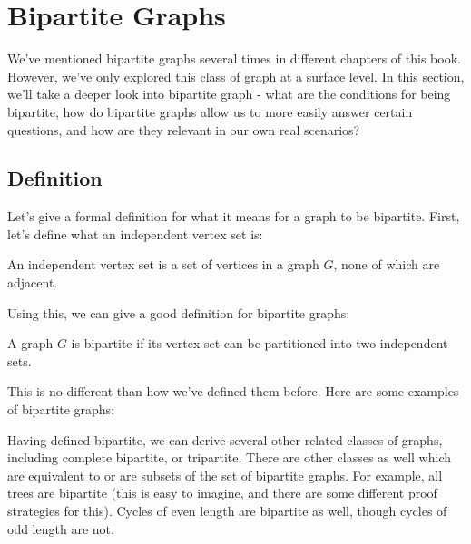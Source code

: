 \section{Bipartite Graphs}
We've mentioned bipartite graphs several times in different chapters of this book. However, we've only explored this class of graph at a surface level. In this section, we'll take a deeper look into bipartite graph - what are the conditions for being bipartite, how do bipartite graphs allow us to more easily answer certain questions, and how are they relevant in our own real scenarios?

\subsection{Definition}
Let's give a formal definition for what it means for a graph to be bipartite. First, let's define what an independent vertex set is:

\begin{definition}
    An independent vertex set is a set of vertices in a graph $G$, none of which are adjacent.
\end{definition}

Using this, we can give a good definition for bipartite graphs:

\begin{definition}
    A graph $G$ is bipartite if its vertex set can be partitioned into two independent sets.
\end{definition}

This is no different than how we've defined them before. Here are some examples of bipartite graphs:


Having defined bipartite, we can derive several other related classes of graphs, including complete bipartite, or tripartite. There are other classes as well which are equivalent to or are subsets of the set of bipartite graphs. For example, all trees are bipartite (this is easy to imagine, and there are some different proof strategies for this). Cycles of even length are bipartite as well, though cycles of odd length are not. 